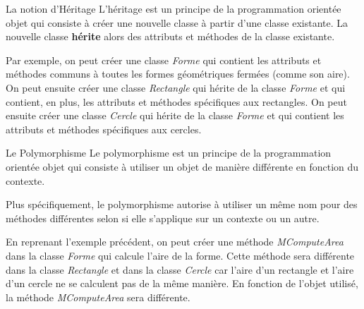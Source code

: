 \begin{UPSTIinfor}{La notion d'Héritage}
    L'héritage est un principe de la programmation orientée objet qui consiste à créer une nouvelle classe à partir d'une classe existante. La nouvelle classe \textbf{hérite} alors des attributs et méthodes de la classe existante. 

    Par exemple, on peut créer une classe \emph{Forme} qui contient les attributs et méthodes communs à toutes les formes géométriques fermées (comme son aire). On peut ensuite créer une classe \emph{Rectangle} qui hérite de la classe \emph{Forme} et qui contient, en plus, les attributs et méthodes spécifiques aux rectangles. On peut ensuite créer une classe \emph{Cercle} qui hérite de la classe \emph{Forme} et qui contient les attributs et méthodes spécifiques aux cercles.
\end{UPSTIinfor}

\begin{UPSTIinfor}{Le Polymorphisme}
    Le polymorphisme est un principe de la programmation orientée objet qui consiste à utiliser un objet de manière différente en fonction du contexte. 

    Plus spécifiquement, le polymorphisme autorise à utiliser un même nom pour des méthodes différentes selon si elle s'applique sur un contexte ou un autre. 

    En reprenant l'exemple précédent, on peut créer une méthode \emph{MComputeArea} dans la classe \emph{Forme} qui calcule l'aire de la forme. Cette méthode sera différente dans la classe \emph{Rectangle} et dans la classe \emph{Cercle} car l'aire d'un rectangle et l'aire d'un cercle ne se calculent pas de la même manière. En fonction de l'objet utilisé, la méthode \emph{MComputeArea} sera différente.
\end{UPSTIinfor}

